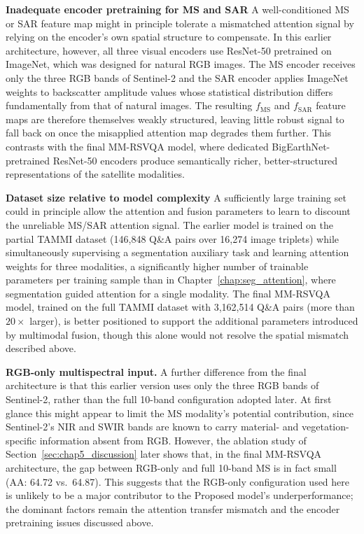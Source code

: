 \textbf{Inadequate encoder pretraining for MS and SAR} A well-conditioned
MS or SAR feature map might in principle tolerate a
mismatched attention signal by relying on the encoder's
own spatial structure to compensate. In this earlier
architecture, however, all three visual encoders use
ResNet-50 pretrained on ImageNet, which was designed for
natural RGB images. The MS encoder receives only the
three RGB bands of Sentinel-2 and the SAR encoder applies ImageNet weights to
backscatter amplitude values whose statistical
distribution differs fundamentally from that of natural
images. The resulting $f_\text{MS}$ and $f_\text{SAR}$
feature maps are therefore themselves weakly structured,
leaving little robust signal to fall back on once the
misapplied attention map degrades them further. This
contrasts with the final MM-RSVQA model, where dedicated
BigEarthNet-pretrained ResNet-50 encoders produce
semantically richer, better-structured representations of
the satellite modalities.
 
\textbf{Dataset size relative to model complexity} A
sufficiently large training set could in principle allow
the attention and fusion parameters to learn to discount
the unreliable MS/SAR attention signal. The earlier model
is trained on the partial TAMMI dataset (146,848 Q\&A
pairs over 16,274 image triplets) while simultaneously
supervising a segmentation auxiliary task and learning
attention weights for three modalities, a significantly
higher number of trainable parameters per training sample
than in Chapter~\ref{chap:seg_attention}, where
segmentation guided attention for a single modality. The
final MM-RSVQA model, trained on the full TAMMI dataset
with 3,162,514 Q\&A pairs (more than $20\times$ larger),
is better positioned to support the additional parameters
introduced by multimodal fusion, though this alone would
not resolve the spatial mismatch described above.
 
\textbf{RGB-only multispectral input.} A further
difference from the final architecture is that this
earlier version uses only the three RGB bands of
Sentinel-2, rather than the full 10-band configuration
adopted later. At first glance this might appear to limit
the MS modality's potential contribution, since
Sentinel-2's NIR and SWIR bands are known to carry
material- and vegetation-specific information absent from
RGB. However, the ablation study of
Section~\ref{sec:chap5_discussion} later shows that, in
the final MM-RSVQA architecture, the gap between RGB-only
and full 10-band MS is in fact small (AA: 64.72 vs.\
64.87). This suggests that the RGB-only configuration
used here is unlikely to be a major contributor to the
Proposed model's underperformance; the dominant factors
remain the attention transfer mismatch and the encoder
pretraining issues discussed above.
 
